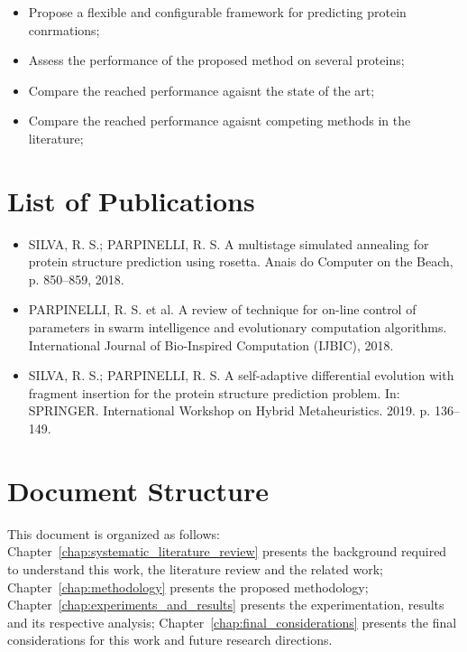 \begin{itemize}
    \item Propose a flexible and configurable framework for predicting protein conrmations;
    \item Assess the performance of the proposed method on several proteins;
    \item Compare the reached performance agaisnt the state of the art;
    \item Compare the reached performance agaisnt competing methods in the literature;
\end{itemize}


\section{List of Publications}\label{sec:list_of_publications}

\begin{itemize}
    \item SILVA, R. S.; PARPINELLI, R. S. A multistage simulated annealing for protein structure prediction using rosetta. Anais do Computer on the Beach, p. 850–859, 2018.
    \item PARPINELLI, R. S. et al. A review of technique for on-line control of parameters in swarm intelligence and evolutionary computation algorithms. International Journal of Bio-Inspired Computation (IJBIC), 2018.
    \item SILVA, R. S.; PARPINELLI, R. S. A self-adaptive differential evolution with fragment insertion  for  the  protein  structure  prediction  problem.  In:  SPRINGER. International Workshop on Hybrid Metaheuristics. 2019. p. 136–149.
\end{itemize}

\section{Document Structure} \label{sec:chap1_document_structure}

This document is organized as follows:
Chapter~\ref{chap:systematic_literature_review} presents the background
required to understand this work, the literature review and the related work;
Chapter~\ref{chap:methodology} presents the proposed methodology;
Chapter~\ref{chap:experiments_and_results} presents the experimentation,
results and its respective analysis;
Chapter~\ref{chap:final_considerations} presents the final considerations for
this work and future research directions.

